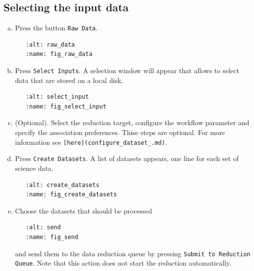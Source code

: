 \subsection{Selecting the input data}

\begin{enumerate}[a)]
\item  Press the button \texttt{Raw Data}.
\begin{verbatim}
   :alt: raw_data
   :name: fig_raw_data
\end{verbatim}

\item  Press \texttt{Select Inputs}. A selection window will appear that allows to select data that are stored on a local disk.

\begin{verbatim}
   :alt: select_input
   :name: fig_select_input
\end{verbatim}

\item (Optional). Select the reduction target, configure the workflow parameter and specify the association preferences. 
Thise steps are optional. For more information see \verb|[here](configure_dataset_.md)|.

\item Press \texttt{Create Datasets}. A list of datasets appears, one line for each set of science data.

\begin{verbatim}
   :alt: create_datasets
   :name: fig_create_datasets
\end{verbatim}


\item Choose the datasets that should be processed 
\begin{verbatim}
   :alt: send
   :name: fig_send
\end{verbatim}
and send them to the data reduction queue by pressing \texttt{Submit to Reduction Queue}. Note that this action does not start the 
reduction automatically.

\end{enumerate}

